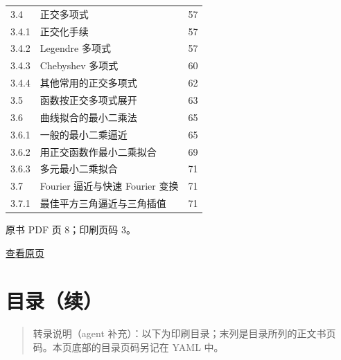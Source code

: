 {\begin{longtable}[]{@{}llr@{}}
3.4 & 正交多项式 & 57 \\
3.4.1 & 正交化手续 & 57 \\
3.4.2 & Legendre 多项式 & 57 \\
3.4.3 & Chebyshev 多项式 & 60 \\
3.4.4 & 其他常用的正交多项式 & 62 \\
3.5 & 函数按正交多项式展开 & 63 \\
3.6 & 曲线拟合的最小二乘法 & 65 \\
3.6.1 & 一般的最小二乘逼近 & 65 \\
3.6.2 & 用正交函数作最小二乘拟合 & 69 \\
3.6.3 & 多元最小二乘拟合 & 71 \\
3.7 & Fourier 逼近与快速 Fourier 变换 & 71 \\
3.7.1 & 最佳平方三角逼近与三角插值 & 71 \\
\end{longtable}
}

\clearpage

原书 PDF 页 8；印刷页码 3。

\href{source-images/pdf-008.jpeg}{查看原页}

\section{目录（续）}\label{front-ux76eeux5f55ux7eed-1}

\begin{quote}
转录说明（agent 补充）：以下为印刷目录；末列是目录所列的正文书页码。本页底部的目录页码另记在 YAML 中。
\end{quote}


